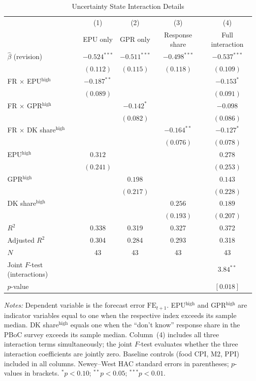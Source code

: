 \begin{table}[htbp]
\centering
\begin{threeparttable}
\caption{Uncertainty State Interaction Details}
\label{tab:uncertainty_details}
\begin{tabular}{lcccc}
\toprule
 & (1) & (2) & (3) & (4) \\
 & EPU only & GPR only & Response share & Full interaction \\
\midrule
$\hat{\beta}$ (revision) & $-0.524^{***}$ & $-0.511^{***}$ & $-0.498^{***}$ & $-0.537^{***}$ \\
 & $(0.112)$ & $(0.115)$ & $(0.118)$ & $(0.109)$ \\
\addlinespace
FR $\times$ EPU$^{\text{high}}$ & $-0.187^{**}$ & & & $-0.153^{*}$ \\
 & $(0.089)$ & & & $(0.091)$ \\
\addlinespace
FR $\times$ GPR$^{\text{high}}$ & & $-0.142^{*}$ & & $-0.098$ \\
 & & $(0.082)$ & & $(0.086)$ \\
\addlinespace
FR $\times$ DK share$^{\text{high}}$ & & & $-0.164^{**}$ & $-0.127^{*}$ \\
 & & & $(0.076)$ & $(0.078)$ \\
\addlinespace
EPU$^{\text{high}}$ & $0.312$ & & & $0.278$ \\
 & $(0.241)$ & & & $(0.253)$ \\
\addlinespace
GPR$^{\text{high}}$ & & $0.198$ & & $0.143$ \\
 & & $(0.217)$ & & $(0.228)$ \\
\addlinespace
DK share$^{\text{high}}$ & & & $0.256$ & $0.189$ \\
 & & & $(0.193)$ & $(0.207)$ \\
\midrule
$R^2$ & 0.338 & 0.319 & 0.327 & 0.372 \\
Adjusted $R^2$ & 0.304 & 0.284 & 0.293 & 0.318 \\
$N$ & 43 & 43 & 43 & 43 \\
\addlinespace
Joint $F$-test (interactions) & & & & $3.84^{**}$ \\
$p$-value & & & & $[0.018]$ \\
\bottomrule
\end{tabular}
\begin{tablenotes}[flushleft]
\footnotesize
\item \textit{Notes:} Dependent variable is the forecast error $\text{FE}_{t+1}$. EPU$^{\text{high}}$ and GPR$^{\text{high}}$ are indicator variables equal to one when the respective index exceeds its sample median. DK share$^{\text{high}}$ equals one when the ``don't know'' response share in the PBoC survey exceeds its sample median. Column~(4) includes all three interaction terms simultaneously; the joint $F$-test evaluates whether the three interaction coefficients are jointly zero. Baseline controls (food CPI, M2, PPI) included in all columns. Newey--West HAC standard errors in parentheses; $p$-values in brackets. $^{*}p<0.10$; $^{**}p<0.05$; $^{***}p<0.01$.
\end{tablenotes}
\end{threeparttable}
\end{table}
